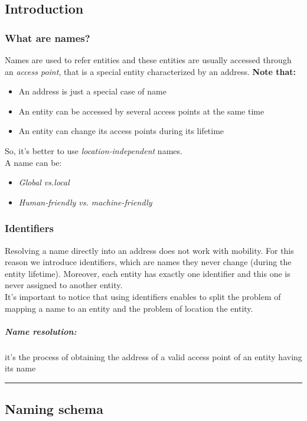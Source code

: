 \subsection{Introduction}
\subsubsection{What are names?}
Names are used to refer entities and these entities are usually accessed through an \emph{access point}, that is a special entity characterized by an address.
\textbf{Note that:}
\begin{itemize}
    \item An address is just a special case of name
    \item An entity can be accessed by several access points at the same time
    \item An entity can change its access points during its lifetime
\end{itemize}
So, it's better to use \emph{location-independent} names.\\
A name can be:
\begin{itemize}
    \item \textit{Global vs.local}
    \item \textit{Human-friendly vs. machine-friendly}
\end{itemize}

\subsubsection{Identifiers}
Resolving a name directly into an address does not work with mobility. For this reason we introduce identifiers, which are names they never change (during the entity lifetime). Moreover, each entity has exactly one identifier and this one is never assigned to another entity.\\
It's important to notice that using identifiers enables to split the problem of mapping a name to an entity and the problem of location the entity.
\subparagraph{Name resolution:} it's the process of obtaining the address of a valid access point of an entity having its name

\begin{center}\rule{3in}{0.4pt}\end{center}

\subsection{Naming schema}


